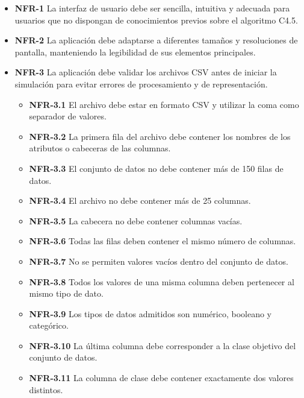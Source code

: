 \begin{itemize}
\item \textbf{NFR-1} La interfaz de usuario debe ser sencilla, intuitiva y adecuada para usuarios que no dispongan de conocimientos previos sobre el algoritmo C4.5.


\item \textbf{NFR-2} La aplicación debe adaptarse a diferentes tamaños y resoluciones de pantalla, manteniendo la legibilidad de sus elementos principales.

\item \textbf{NFR-3} La aplicación debe validar los archivos CSV antes de iniciar la simulación para evitar errores de procesamiento y de representación.

\begin{itemize}
    \item \textbf{NFR-3.1} El archivo debe estar en formato CSV y utilizar la coma como separador de valores.

    \item \textbf{NFR-3.2} La primera fila del archivo debe contener los nombres de los atributos o cabeceras de las columnas.

    \item \textbf{NFR-3.3} El conjunto de datos no debe contener más de 150 filas de datos.

    \item \textbf{NFR-3.4} El archivo no debe contener más de 25 columnas.

    \item \textbf{NFR-3.5} La cabecera no debe contener columnas vacías.

    \item \textbf{NFR-3.6} Todas las filas deben contener el mismo número de columnas.

    \item \textbf{NFR-3.7} No se permiten valores vacíos dentro del conjunto de datos.

    \item \textbf{NFR-3.8} Todos los valores de una misma columna deben pertenecer al mismo tipo de dato.

    \item \textbf{NFR-3.9} Los tipos de datos admitidos son numérico, booleano y categórico.

    \item \textbf{NFR-3.10} La última columna debe corresponder a la clase objetivo del conjunto de datos.

    \item \textbf{NFR-3.11} La columna de clase debe contener exactamente dos valores distintos.


\end{itemize}
\end{itemize}
